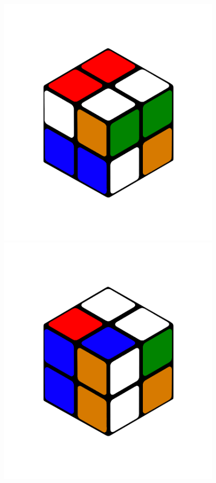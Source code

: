 \documentclass[12pt,a4paper, usenames, dvipsnames]{scrartcl}
\begin{document}
\begin{figure}[h]
\includegraphics[scale=0.04]{UpAfterFront.png}
\includegraphics[scale=0.04]{FrontAfterUp.png}

\end{figure}
\end{document}
